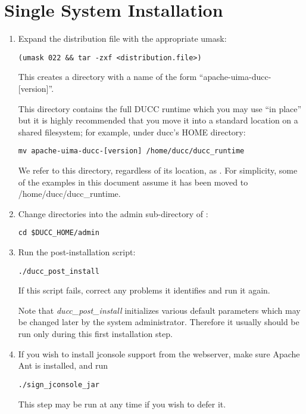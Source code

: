 \section{Single System Installation}
\label{subsec:install.single-user}
    \begin{enumerate}
      \item Expand the distribution file with the appropriate umask:
\begin{verbatim}
(umask 022 && tar -zxf <distribution.file>)
\end{verbatim}

        This creates a directory with a name of the form ``apache-uima-ducc-[version]''.
  
        This directory contains the full DUCC runtime which
        you may use ``in place'' but it is highly recommended that you move it
        into a standard location on a shared filesystem; for example, under ducc's HOME directory:
\begin{verbatim}
mv apache-uima-ducc-[version] /home/ducc/ducc_runtime
\end{verbatim}

        We refer to this directory, regardless of its location, as \duccruntime. For simplicity,
        some of the examples in this document assume it has been moved to /home/ducc/ducc\_runtime.

      \item Change directories into the admin sub-directory of \duccruntime: 
\begin{verbatim}
cd $DUCC_HOME/admin
\end{verbatim}

        \item Run the post-installation script: 
\begin{verbatim}
./ducc_post_install
\end{verbatim}
          If this script fails, correct any problems it identifies and run it again.

          Note that {\em ducc\_post\_install} initializes various default parameters which 
          may be changed later by the system administrator.  Therefore it usually should be
          run only during this first installation step.

        \item If you wish to install jconsole support from the webserver, make sure Apache Ant
          is installed, and run
\begin{verbatim}
./sign_jconsole_jar
\end{verbatim}
          This step may be run at any time if you wish to defer it.

   \end{enumerate}

